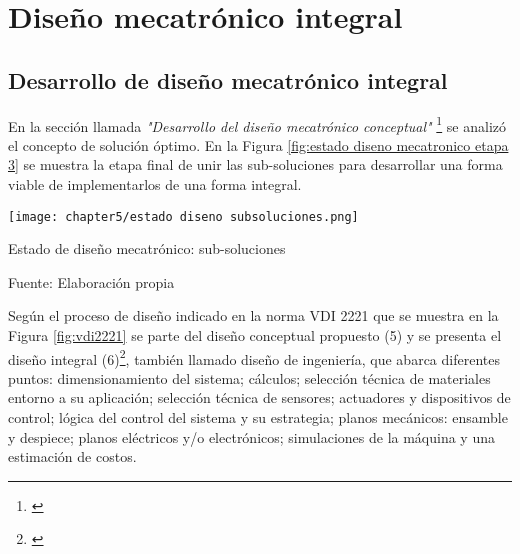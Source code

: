 
\pagestyle{myportland}
\doublespacing
\chapter[----- Diseño mecatrónico integral]{Diseño mecatrónico integral}
\thispagestyle{myportland}


\section{Desarrollo de diseño mecatrónico integral}

En la sección llamada \textit{"Desarrollo del diseño mecatrónico conceptual"} \footnote{\cite{DiazVergara2020}} se analizó el concepto de solución óptimo. En la Figura \ref{fig:estado diseno mecatronico etapa 3} se muestra la etapa final de unir las sub-soluciones para desarrollar una forma viable de implementarlos de una forma integral.

\begin{myfigure}[H]
	\centering
	\texttt{[image: chapter5/estado diseno subsoluciones.png]}
	\caption{Estado de diseño mecatrónico: sub-soluciones}
	\begin{myflushleftportland}
		Fuente: Elaboración propia
	\end{myflushleftportland}
	\label{fig:estado diseno mecatronico etapa 3}
\end{myfigure}

Según el proceso de diseño indicado en la norma VDI 2221 que se muestra en la Figura \ref{fig:vdi2221} se parte del diseño conceptual propuesto (5) y se presenta el diseño integral (6)\footnote{\cite{Pahl2007}}, también llamado diseño de ingeniería, que abarca diferentes puntos: dimensionamiento del sistema; cálculos; selección técnica de materiales entorno a su aplicación; selección técnica de sensores; actuadores y dispositivos de control; lógica del control del sistema y su estrategia; planos mecánicos: ensamble y despiece; planos eléctricos y/o electrónicos; simulaciones de la máquina y una estimación de costos.

